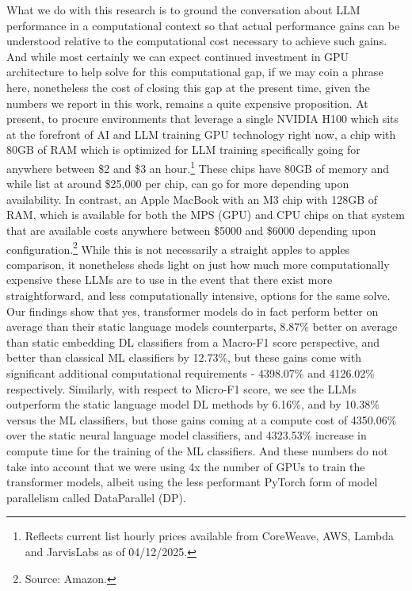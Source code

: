 \documentclass[final]{clv2025}
\begin{document}
What we do with this research is to ground the conversation about LLM performance in a computational context so that actual performance gains can be understood relative to the computational cost necessary to achieve such gains. And while most certainly we can expect continued investment in GPU architecture to help solve for this computational gap, if we may coin a phrase here, nonetheless the cost of closing this gap at the present time, given the numbers we report in this work, remains a quite expensive proposition. At present, to procure environments that leverage a single NVIDIA H100 which sits at the forefront of AI and LLM training GPU technology right now, a chip with 80GB of RAM which is optimized for LLM training specifically going for anywhere between \$2 and \$3 an hour.\footnote{Reflects current list hourly prices available from CoreWeave, AWS, Lambda and JarvisLabs as of 04/12/2025.} These chips have 80GB of memory and while list at around \$25,000 per chip, can go for more depending upon availability. In contrast, an Apple MacBook with an M3 chip with 128GB of RAM, which is available for both the MPS (GPU) and CPU chips on that system that are available costs anywhere between \$5000 and \$6000 depending upon configuration.\footnote{Source: Amazon.} While this is not necessarily a straight apples to apples comparison, it nonetheless sheds light on just how much more computationally expensive these LLMs are to use in the event that there exist more straightforward, and less computationally intensive, options for the same solve. Our findings show that yes, transformer models do in fact perform better on average than their static language models counterparts, 8.87\% better on average than static embedding DL classifiers from a Macro-F1 score perspective, and better than classical ML classifiers by 12.73\%, but these gains come with significant additional computational requirements - 4398.07\% and 4126.02\% respectively. Similarly, with respect to Micro-F1 score, we see the LLMs outperform the static language model DL methods by 6.16\%, and by 10.38\% versus the ML classifiers, but those gains coming at a compute cost of 4350.06\% over the static neural language model classifiers, and 4323.53\% increase in compute time for the training of the ML classifiers. And these numbers do not take into account that we were using 4x the number of GPUs to train the transformer models, albeit using the less performant PyTorch form of model parallelism called DataParallel (DP).
\end{document}
